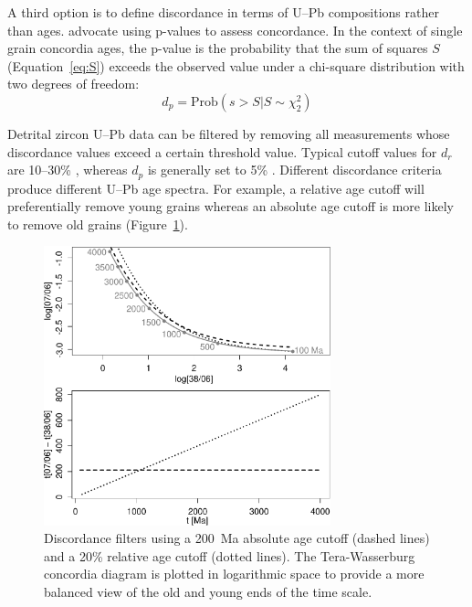 \documentclass[gchron, manuscript]{copernicus}
\begin{document}
A third option is to define discordance in terms of U--Pb compositions
rather than ages. \citet{spencer2016} advocate using p-values to
assess concordance. In the context of single grain concordia ages, the
p-value is the probability that the sum of squares $S$
(Equation~\ref{eq:S}) exceeds the observed value under a chi-square
distribution with two degrees of freedom:
\begin{equation}
  d_p = \mbox{Prob}\left(s > S | S \sim \chi^2_2
    \right)
  \label{eq:dp}
\end{equation}

Detrital zircon U--Pb data can be filtered by removing all
measurements whose discordance values exceed a certain threshold
value. Typical cutoff values for $d_r$ are 10--30\%
\citep{gehrels2011}, whereas $d_p$ is generally set to 5\%
\citep{spencer2016}. Different discordance criteria produce different
U--Pb age spectra. For example, a relative age cutoff will
preferentially remove young grains whereas an absolute age cutoff is
more likely to remove old grains (Figure~\ref{fig:agediscordance}).\\

\begin{figure}[t]
  \includegraphics[width=8.3cm]{TW-option-12.pdf}
  \caption{Discordance filters using a 200~Ma absolute age cutoff
    (dashed lines) and a 20\% relative age cutoff (dotted
    lines). The Tera-Wasserburg concordia diagram is plotted in
    logarithmic space to provide a more balanced view of the old and
    young ends of the time scale.
  }
  \label{fig:agediscordance}
\end{figure}
\end{document}
